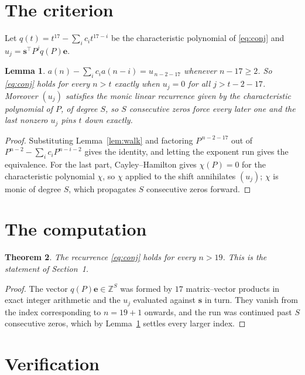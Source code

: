 \documentclass[11pt,a4paper]{article}
\theoremstyle{plain}
\newtheorem{theorem}{Theorem}
\newtheorem{lemma}[theorem]{Lemma}
\theoremstyle{definition}
\begin{document}
\section{The criterion}

Let $q(t)=t^{17}-\sum_i c_i t^{17-i}$ be the characteristic polynomial of
\eqref{eq:conj} and $u_j=\mathbf{s}^{\!\top}P^{j}q(P)\mathbf{e}$.

\begin{lemma}\label{lem:crit}
$a(n)-\sum_i c_i a(n-i)=u_{\,n-2-17}$ whenever $n-17\ge2$. So \eqref{eq:conj}
holds for every $n>t$ exactly when $u_j=0$ for all $j>t-2-17$. Moreover $(u_j)$
satisfies the monic linear recurrence given by the characteristic polynomial of $P$, of
degree $S$, so $S$ consecutive zeros force every later one and the last nonzero $u_j$ pins
$t$ down exactly.
\end{lemma}

\begin{proof}
Substituting Lemma~\ref{lem:walk} and factoring $P^{\,n-2-17}$ out of
$P^{n-2}-\sum_i c_i P^{n-i-2}$ gives the identity, and letting the exponent run gives the
equivalence. For the last part, Cayley--Hamilton gives $\chi(P)=0$ for the characteristic
polynomial $\chi$, so $\chi$ applied to the shift annihilates $(u_j)$; $\chi$ is monic of
degree $S$, which propagates $S$ consecutive zeros forward.
\end{proof}

\section{The computation}

\begin{theorem}
The recurrence \eqref{eq:conj} holds for every $n>19$. This is the statement of
Section~1.
\end{theorem}

\begin{proof}
The vector $q(P)\mathbf{e}\in\mathbb{Z}^{S}$ was formed by $17$ matrix--vector
products in exact integer arithmetic and the $u_j$ evaluated against $\mathbf{s}$ in turn.
They vanish from the index corresponding to $n=19+1$ onwards, and the run was continued
past $S$ consecutive zeros, which by Lemma~\ref{lem:crit} settles every larger index.
\end{proof}

\section{Verification}
\end{document}
